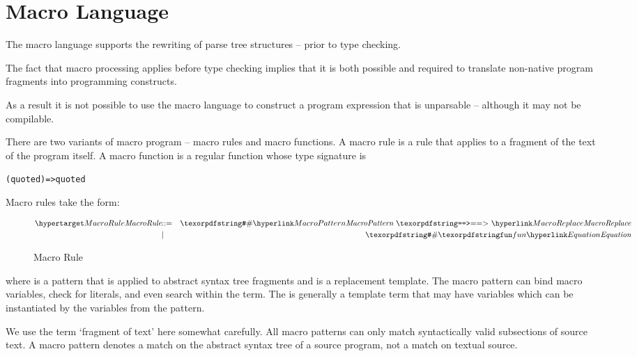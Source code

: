 \chapter{Macro Language}
\label{MacroLanguage}
The macro language supports the rewriting of parse tree structures -- prior to type checking.
\begin{aside}
The fact that macro processing applies before type checking implies that it is both possible and required to translate non-native \Sr program fragments into \Sr programming constructs.
\end{aside}

\begin{aside}
As a result it is not possible to use the macro  language to construct a program expression that is unparsable -- although it may not be compilable.
\end{aside}

There are two variants of macro program -- macro rules and macro functions. 
A macro rule is a rule that applies to a fragment of the text of the program itself. A macro function is a regular \Sr function whose type signature is 
\begin{alltt}
(quoted)=>quoted
\end{alltt}

Macro rules take the form:
\begin{figure}[htbp]
\begin{eqnarray*}
\ntDef{MacroRule}&\arrow&\q{\#}\ntRef{MacroPattern}\ \q{==>}\ \ntRef{MacroReplace}\\
&\choice&\q{\#} \q{fun} \ntRef{Equation}\\
\end{eqnarray*}
\caption{Macro Rule}
\label{macroRuleFig}
\end{figure}

\noindent
where  is a pattern that is applied to abstract syntax tree fragments and  is a replacement template. The macro pattern can bind macro variables, check for literals, and even search within the term. The  is generally a template term that may have variables which can be instantiated by the variables from the pattern.

\begin{aside}
We use the term `fragment of text' here somewhat carefully. All macro patterns can only match syntactically valid subsections of source text. A macro pattern denotes a match on the abstract syntax tree of a source program, not a match on textual source.
\end{aside}

